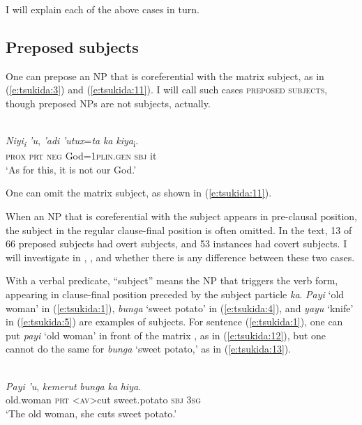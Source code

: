 \documentclass[output=paper
,modfonts
,nonflat]{langsci/langscibook}
\begin{document}
\noindent
I will explain each of the above cases in turn.

\subsection{\label{s:tsukida:2.1}Preposed subjects}

One can prepose an NP that is coreferential with the matrix subject, as in (\ref{e:tsukida:3}) and (\ref{e:tsukida:11}). I will call such cases \textsc{preposed subjects}, though preposed NPs are not subjects, actually.

\begin{exe}
	\label{e:tsukida:11}\\
	\gll \textit{Niyi\textsubscript{i}} \textit{'u}, \textit{'adi} \textit{'utux}=\textit{ta} {\USOParen}\textit{ka}  \textit{kiya}\textsubscript{i}{\USCParen}.\\
	\textsc{prox} \textsc{prt} \textsc{neg} God=\textsc{1plin.gen} \phantom{(}\textsc{sbj} it\\
	\glt ‘As for this, it is not our God.’
\end{exe}

\noindent
One can omit the matrix subject, as shown in (\ref{e:tsukida:11}).   

When an NP that is coreferential with the subject appears in pre-clausal position, the subject in the regular clause-final position is often omitted. In the text, 13 of 66 preposed subjects had overt subjects, and 53 instances had covert subjects. I will investigate in , , and  whether there is any difference between these two cases.

With a verbal predicate, “subject” means the NP that triggers the verb form, appearing in clause-final position preceded by the subject particle \textit{ka}. \textit{Payi} ‘old woman’ in (\ref{e:tsukida:1}), \textit{bunga} ‘sweet potato’ in (\ref{e:tsukida:4}), and \textit{yayu} ‘knife’ in (\ref{e:tsukida:5}) are examples of subjects. For sentence (\ref{e:tsukida:1}), one can put \textit{payi} ‘old woman’ in front of the matrix , as in (\ref{e:tsukida:12}), but one cannot do the same for \textit{bunga} ‘sweet potato,’ as in (\ref{e:tsukida:13}).

\begin{exe}
	\label{e:tsukida:12}\\
	\gll \textit{Payi} \textit{'u},  \textit{k}{\USSmaller}\textit{em}{\USGreater}\textit{erut} \textit{bunga} {\USOParen}\textit{ka}  \textit{hiya}{\USCParen}.\\
	old.woman \textsc{prt}  <\textsc{av}>cut sweet.potato \phantom{(}\textsc{sbj} \textsc{3sg}\\
	\glt ‘The old woman, she cuts sweet potato.’
\end{exe}
\end{document}
